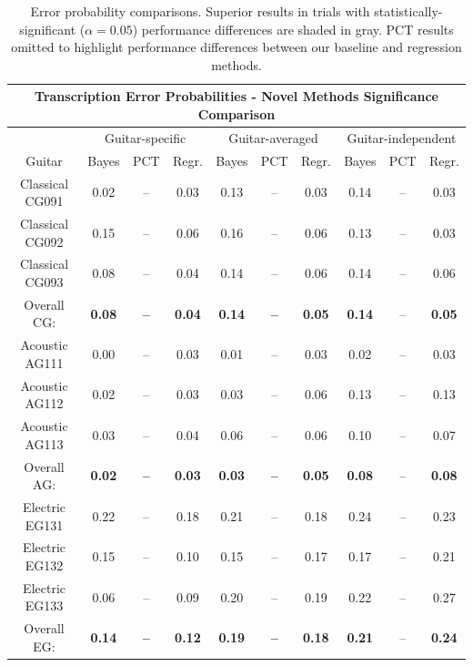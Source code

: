 \documentclass[12pt]{cmuthesis}
\begin{document}
\begin{table}[!htbp]
\begin{center}
\begin{tabular} {||c||c|c|c||c|c|c||c|c|c||}
\hline
\multicolumn{10}{||c||}{\bf{Transcription Error Probabilities - Novel Methods Significance Comparison}} \\
\hline
 & \multicolumn{3}{|c||}{Guitar-specific} & \multicolumn{3}{|c||}{Guitar-averaged}& \multicolumn{3}{|c||}{Guitar-independent}\\
\hline
Guitar & Bayes & PCT & Regr. & Bayes & PCT & Regr. & Bayes & PCT & Regr.\\
\hline
\hline
Classical CG091 & 0.02 & -- & 0.03 & 0.13 & -- & \cellcolor[gray]{0.8}0.03 & 0.14 & -- & \cellcolor[gray]{0.8}0.03 \\
\hline
Classical CG092 & 0.15 & -- & \cellcolor[gray]{0.8}0.06 & 0.16 & -- & \cellcolor[gray]{0.8}0.06 & 0.13 & -- & \cellcolor[gray]{0.8}0.03 \\
\hline
Classical CG093 & 0.08 & -- & \cellcolor[gray]{0.8}0.04 & 0.14 & -- & \cellcolor[gray]{0.8}0.06 & 0.14 & -- & \cellcolor[gray]{0.8}0.06 \\
\hline
Overall CG: & \bf{0.08} & \bf{--}  & \cellcolor[gray]{0.8}\bf{0.04} & \bf{0.14} & \bf{--} & \cellcolor[gray]{0.8}\bf{0.05} & \bf{0.14} & -- & \cellcolor[gray]{0.8}\bf{0.05}\\
\hline
\hline
Acoustic AG111 & \cellcolor[gray]{0.8}0.00 & -- & 0.03 & \cellcolor[gray]{0.8}0.01 & -- & 0.03 & \cellcolor[gray]{0.8}0.02 & -- & 0.03 \\
\hline
Acoustic AG112 & 0.02 & -- & 0.03 & \cellcolor[gray]{0.8}0.03 & -- & 0.06 & 0.13 & -- & 0.13 \\
\hline
Acoustic AG113  & 0.03 & -- & 0.04 & 0.06 & -- & 0.06 & 0.10 & -- & \cellcolor[gray]{0.8}0.07\\
\hline
Overall AG: & \cellcolor[gray]{0.8}\bf{0.02} & \bf{--} & \bf{0.03} & \cellcolor[gray]{0.8}\bf{0.03} & \bf{--} & \bf{0.05} & \bf{0.08} & -- & \bf{0.08}\\
\hline
\hline
Electric EG131 & 0.22 & -- & 0.18 & 0.21 & -- & 0.18 & 0.24 & -- & 0.23\\
\hline
Electric EG132 & 0.15 & -- & \cellcolor[gray]{0.8}0.10 & 0.15 & -- & 0.17 & \cellcolor[gray]{0.8}0.17 & -- & 0.21\\
\hline
Electric EG133 & 0.06 & -- & 0.09 & 0.20 & --  & 0.19 & \cellcolor[gray]{0.8}0.22 & -- & 0.27 \\
\hline
Overall EG: & \bf{0.14} & \bf{--} & \cellcolor[gray]{0.8}\bf{0.12} & \bf{0.19} & \bf{--} & \bf{0.18} & \cellcolor[gray]{0.8}\bf{0.21} & -- & \bf{0.24}\\
\hline
\hline
\hline
\end{tabular}
\caption{Error probability comparisons. Superior results in trials with statistically-significant ($\alpha=0.05$) performance differences are shaded in gray. PCT results omitted to highlight performance differences between our baseline and regression methods.}
\label{tab:mcnemar-RWC}
\end{center}
\end{table}
\end{document}
